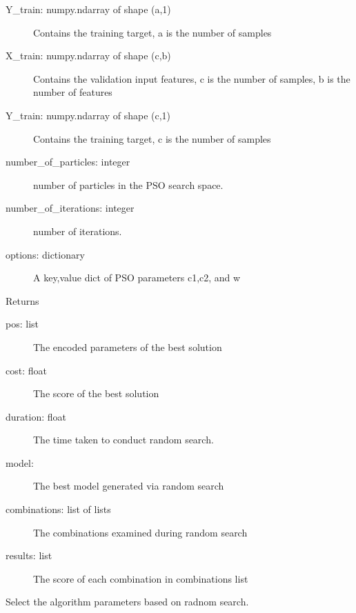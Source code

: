 \documentclass[letterpaper,10pt,english]{sphinxmanual}
\begin{document}
\begin{fulllineitems}
\begin{fulllineitems}
\begin{description}
\item[{Y\_train: numpy.ndarray of shape (a,1)}] \leavevmode
Contains the training target, a is the number of samples

\item[{X\_train: numpy.ndarray of shape (c,b)}] \leavevmode
Contains the validation input features, c is the number of samples, b is the number of features

\item[{Y\_train: numpy.ndarray of shape (c,1)}] \leavevmode
Contains the training target, c is the number of samples

\item[{number\_of\_particles: integer}] \leavevmode
number of particles in the PSO search space.

\item[{number\_of\_iterations: integer}] \leavevmode
number of iterations.

\item[{options: dictionary}] \leavevmode
A key,value dict of PSO parameters c1,c2, and w

\end{description}

Returns
\begin{description}
\item[{pos: list}] \leavevmode
The encoded parameters of the best solution

\item[{cost: float}] \leavevmode
The score of the best solution

\item[{duration: float}] \leavevmode
The time taken to conduct random search.

\item[{model:}] \leavevmode
The best model generated via random search

\item[{combinations: list of lists}] \leavevmode
The combinations examined during random search

\item[{results: list}] \leavevmode
The score of each combination in combinations list

\end{description}

\end{fulllineitems}


\begin{fulllineitems}
\label{\detokenize{index:pspso.pspso.fitpsrandom}}
Select the algorithm parameters based on radnom search.


\end{fulllineitems}
\end{fulllineitems}
\end{document}
